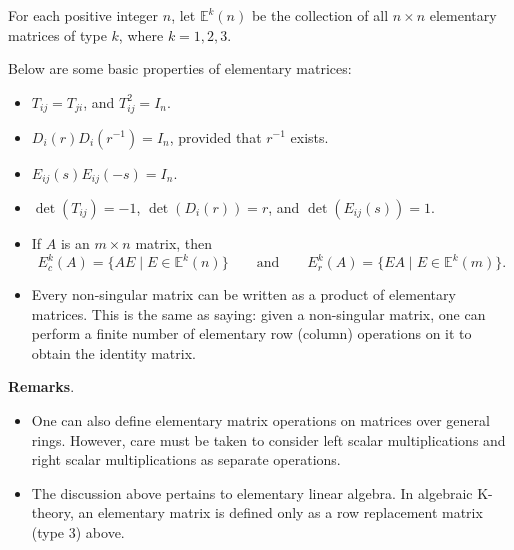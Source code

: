 \documentclass[12pt]{article}
\begin{document}
For each positive integer $n$, let $\mathbb{E}^k(n)$ be the collection of all $n\times n$ elementary matrices of type $k$, where $k=1,2,3$.

Below are some basic properties of elementary matrices:
\begin{itemize}
\item $T_{ij}=T_{ji}$, and $T_{ij}^2=I_n$.
\item $D_i(r)D_i(r^{-1})=I_n$, provided that $r^{-1}$ exists.
\item $E_{ij}(s) E_{ij}(-s) = I_n$.
\item $\det(T_{ij})=-1$, $\det(D_i(r))=r$, and $\det(E_{ij}(s))=1$.
\item If $A$ is an $m\times n$ matrix, then $$E_c^k(A)=\lbrace AE \mid E \in \mathbb{E}^k(n) \rbrace \qquad \mbox{and} \qquad E_r^k(A)=\lbrace EA \mid E \in \mathbb{E}^k(m) \rbrace.$$
\item Every non-singular matrix can be written as a product of elementary matrices.  This is the same as saying: given a non-singular matrix, one can perform a finite number of elementary row (column) operations on it to obtain the identity matrix.
\end{itemize}

\textbf{Remarks}.  
\begin{itemize}
\item One can also define elementary matrix operations on matrices over general rings.  However, care must be taken to consider left scalar multiplications and right scalar multiplications as separate operations.
\item The discussion above pertains to elementary linear algebra.  In algebraic K-theory, an elementary matrix is defined only as a row replacement matrix (type 3) above.
\end{itemize}

\end{document}
